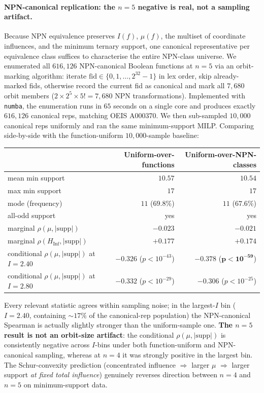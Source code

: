 \documentclass[11pt]{article}
\newcommand{\Inf}{\mathrm{Inf}}
\newcommand{\supp}{\mathrm{supp}}
\begin{document}
\paragraph{NPN-canonical replication: the $n=5$ negative is real, not a sampling artifact.}
Because NPN equivalence preserves $I(f)$, $\mu(f)$, the multiset of coordinate influences, and the minimum ternary support, one canonical representative per equivalence class suffices to characterise the entire NPN-class universe. We enumerated all $616{,}126$ NPN-canonical Boolean functions at $n=5$ via an orbit-marking algorithm: iterate $\text{fid} \in \{0, 1, \ldots, 2^{32}-1\}$ in lex order, skip already-marked fids, otherwise record the current fid as canonical and mark all $7{,}680$ orbit members ($2 \times 2^5 \times 5! = 7{,}680$ NPN transformations). Implemented with \texttt{numba}, the enumeration runs in $65$ seconds on a single core and produces exactly $616{,}126$ canonical reps, matching OEIS A000370. We then sub-sampled $10{,}000$ canonical reps uniformly and ran the same minimum-support MILP. Comparing side-by-side with the function-uniform $10{,}000$-sample baseline:

\begin{center}
\small
\begin{tabular}{lrr}
\toprule
& Uniform-over-functions & \textbf{Uniform-over-NPN-classes} \\
\midrule
mean min support & $10.57$ & $10.54$ \\
max min support & $17$ & $17$ \\
mode (frequency) & $11$ ($69.8\%$) & $11$ ($67.6\%$) \\
all-odd support & yes & yes \\
marginal $\rho(\mu, |\supp|)$ & $-0.023$ & $-0.021$ \\
marginal $\rho(H_{\Inf}, |\supp|)$ & $+0.177$ & $+0.174$ \\
conditional $\rho(\mu, |\supp|)$ at $I=2.40$ & $-0.326$ ($p<10^{-43}$) & $\mathbf{-0.378}$ ($\mathbf{p<10^{-59}}$) \\
conditional $\rho(\mu, |\supp|)$ at $I=2.80$ & $-0.332$ ($p<10^{-29}$) & $\mathbf{-0.306}$ ($p<10^{-25}$) \\
\bottomrule
\end{tabular}
\end{center}

Every relevant statistic agrees within sampling noise; in the largest-$I$ bin ($I=2.40$, containing $\sim 17\%$ of the canonical-rep population) the NPN-canonical Spearman is actually slightly stronger than the uniform-sample one. \textbf{The $n=5$ result is not an orbit-size artifact}: the conditional $\rho(\mu, |\supp|)$ is consistently negative across $I$-bins under both function-uniform and NPN-canonical sampling, whereas at $n=4$ it was strongly positive in the largest bin. The Schur-convexity prediction (concentrated influence $\Rightarrow$ larger $\mu$ $\Rightarrow$ larger support \emph{at fixed total influence}) genuinely reverses direction between $n=4$ and $n=5$ on minimum-support data.
\end{document}
